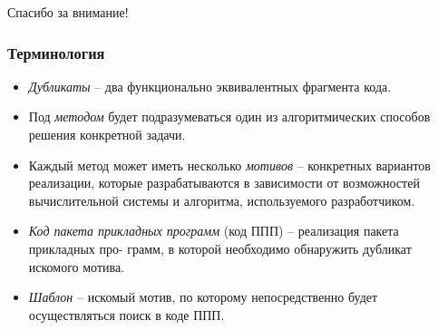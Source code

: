 \documentclass{beamer}
\begin{document}






\begin{frame}
\begin{center}
	Спасибо за внимание!
\end{center}
\end{frame}



\begin{frame}
\frametitle{Терминология}
\begin{itemize}
	\item \textit{Дубликаты} -- два функционально эквивалентных фрагмента кода.
	\item Под \textit{методом} будет подразумеваться один из алгоритмических способов решения конкретной задачи.
	\item Каждый метод может иметь несколько \textit{мотивов} – конкретных вариантов реализации, которые разрабатываются в зависимости от возможностей вычислительной системы и алгоритма, используемого разработчиком.
	\item \textit{Код пакета прикладных программ} (код ППП) – реализация пакета прикладных про-
грамм, в которой необходимо обнаружить дубликат искомого мотива.
	\item \textit{Шаблон} -- искомый мотив, по которому непосредственно будет осуществляться поиск в коде ППП.
\end{itemize}
\end{frame}
\end{document}
